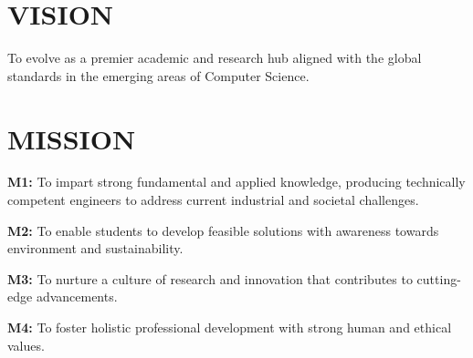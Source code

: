 \section*{VISION}
To evolve as a premier academic and research hub aligned with the global standards in the emerging areas of Computer Science.
\section*{MISSION}
\noindent\textbf{M1:} To impart strong fundamental and applied knowledge, producing technically competent engineers to address current industrial and societal challenges.

\noindent\textbf{M2:} To enable students to develop feasible solutions with awareness towards environment and sustainability.

\noindent\textbf{M3:} To nurture a culture of research and innovation that contributes to cutting-edge advancements.

\noindent\textbf{M4:} To foster holistic professional development with strong human and ethical values.
